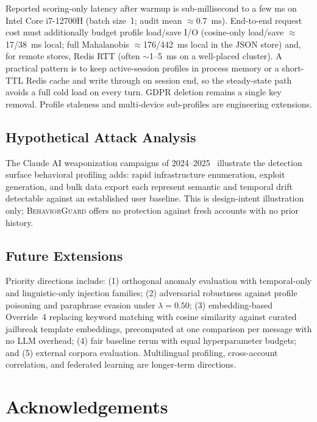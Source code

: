 \documentclass[conference]{IEEEtran}
\newcommand{\BG}{\textsc{BehaviorGuard}}
\begin{document}
Reported scoring-only latency after warmup is sub-millisecond to a few ms on
Intel Core i7-12700H (batch size~1; audit mean $\approx$0.7~ms).
End-to-end request cost must additionally budget profile load/save I/O
(cosine-only load/save $\approx$17/38~ms local; full Mahalanobis
$\approx$176/442~ms local in the JSON store) and, for remote stores, Redis RTT
(often $\sim$1--5~ms on a well-placed cluster).
A practical pattern is to keep active-session profiles in process memory or a
short-TTL Redis cache and write through on session end, so the steady-state path
avoids a full cold load on every turn.
GDPR deletion remains a single key removal.
Profile staleness and multi-device sub-profiles are engineering extensions.

\subsection{Hypothetical Attack Analysis}

The Claude AI weaponization campaigns of 2024--2025~\cite{anthropic2025espionage}
illustrate the detection surface behavioral profiling adds: rapid infrastructure
enumeration, exploit generation, and bulk data export each represent semantic and
temporal drift detectable against an established user baseline. This is design-intent
illustration only; \BG{} offers no protection against fresh accounts with no prior
history.

\subsection{Future Extensions}
\label{sec:extensions}

Priority directions include: (1) orthogonal anomaly evaluation with temporal-only and
linguistic-only injection families; (2) adversarial robustness against profile poisoning
and paraphrase evasion under $\lambda{=}0.50$; (3) embedding-based Override~4 replacing
keyword matching with cosine similarity against curated jailbreak template embeddings,
precomputed at one comparison per message with no LLM overhead; (4) fair baseline rerun
with equal hyperparameter budgets; and (5) external corpora evaluation. Multilingual
profiling, cross-account correlation, and federated learning are longer-term directions.


\section*{Acknowledgements}
\end{document}
